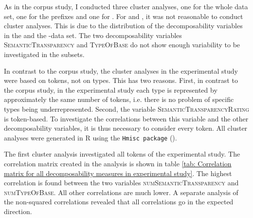 As in the corpus study, I conducted three cluster analyses, one for the whole data set, one for the prefixes and one for .  
For  and , it was not reasonable to conduct cluster analyses. This is due to the distribution of the decomposability variables in the  and the -data set. The two decomposability variables \textsc{SemanticTransparency} and \textsc{TypeOfBase} do not show enough variability to be investigated in the subsets. 


 In contrast to the corpus study, the cluster analyses in the experimental study were based on tokens, not on types. This has two reasons. First, in contrast to the corpus study, in the experimental study each type is represented by approximately the same number of tokens, i.e. there is no problem of specific types being underrepresented. Second, the variable \textsc{SemanticTransparencyRating} is token-based. To investigate the correlations between this variable and the other decomposability variables, it is thus necessary to consider every token.
All cluster analyses were generated in R using the \texttt{Hmisc package} (\citealt{Harrell.2017}).

   The first cluster analysis investigated all tokens of the experimental  study. The correlation matrix created in the analysis is shown in table \ref{tab: Correlation matrix for all decomposability measures in experimental study}. 
   The highest correlation is found between the two variables \textsc{numSemanticTransparency} and \textsc{numTypeOfBase}. All other correlations are much lower. A separate analysis of the non-squared correlations revealed that all correlations go in the expected direction. 
   
   


